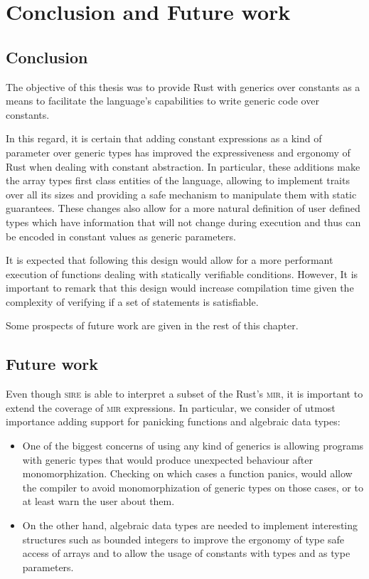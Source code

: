 \chapter{Conclusion and Future work}
\label{chap:conclusion}

\section{Conclusion}

The objective of this thesis was to provide Rust with generics over constants
as a means to facilitate the language's capabilities to write generic code over
constants.

In this regard, it is certain that adding constant expressions as a kind of
parameter over generic types has improved the expressiveness and ergonomy of
Rust when dealing with constant abstraction. In particular, these additions
make the array types first class entities of the language, allowing to
implement traits over all its sizes and providing a safe mechanism to
manipulate them with static guarantees. These changes also allow for a more
natural definition of user defined types which have information that will not
change during execution and thus can be encoded in constant values as generic
parameters.

It is expected that following this design would allow for a more performant
execution of functions dealing with statically verifiable conditions. However,
It is important to remark that this design would increase compilation time
given the complexity of verifying if a set of statements is satisfiable.

Some prospects of future work are given in the rest of this chapter.


\section{Future work}

Even though \textsc{sire} is able to interpret a subset of the Rust's
\textsc{mir}, it is important to extend the coverage of \textsc{mir}
expressions. In particular, we consider of utmost importance adding support for
panicking functions and algebraic data types:

\begin{itemize}

\item One of the biggest concerns of using any kind of generics is allowing
    programs with generic types that would produce unexpected behaviour after
    monomorphization. Checking on which cases a function panics, would allow
    the compiler to avoid monomorphization of generic types on those cases, or
    to at least warn the user about them.

\item On the other hand, algebraic data types are needed to implement
    interesting structures such as bounded integers to improve the ergonomy of
    type safe access of arrays and to allow the usage of constants with types
     and  as type parameters.

\end{itemize}

